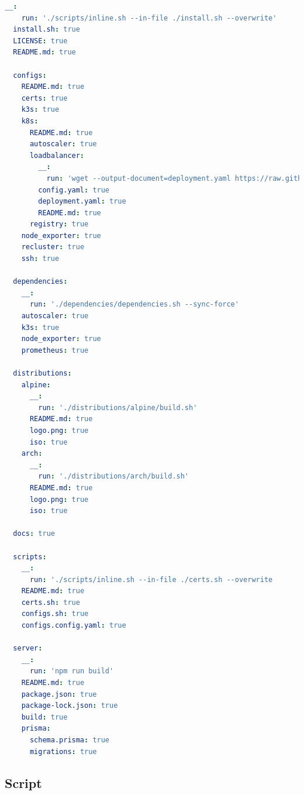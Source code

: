 \begin{lstlisting}[language=yaml, alsoletter={._-}, morekeywords={[2]{__, run, install.sh, LICENSE, README.md, configs, certs, k3s, k8s, autoscaler, loadbalancer, config.yaml, deployment.yaml, registry, node_exporter, recluster, ssh, dependencies, prometheus, distributions, alpine, arch, logo.png, iso, docs, scripts, certs.sh, configs.sh, configs.config.yaml, server, package.json, package-lock.json, build, prisma, schema.prisma, migrations}}, xleftmargin=\parindent, label={lst:bundle_config}, caption=Content of bundle configuration file]
  __:
    run: './scripts/inline.sh --in-file ./install.sh --overwrite'
  install.sh: true
  LICENSE: true
  README.md: true

  configs:
    README.md: true
    certs: true
    k3s: true
    k8s:
      README.md: true
      autoscaler: true
      loadbalancer:
        __:
          run: 'wget --output-document=deployment.yaml https://raw.githubusercontent.com/metallb                /metallb/v0.13.7/config/manifests/metallb-native.yaml'
        config.yaml: true
        deployment.yaml: true
        README.md: true
      registry: true
    node_exporter: true
    recluster: true
    ssh: true

  dependencies:
    __:
      run: './dependencies/dependencies.sh --sync-force'
    autoscaler: true
    k3s: true
    node_exporter: true
    prometheus: true

  distributions:
    alpine:
      __:
        run: './distributions/alpine/build.sh'
      README.md: true
      logo.png: true
      iso: true
    arch:
      __:
        run: './distributions/arch/build.sh'
      README.md: true
      logo.png: true
      iso: true

  docs: true

  scripts:
    __:
      run: './scripts/inline.sh --in-file ./certs.sh --overwrite                                            && ./scripts/inline.sh --in-file ./configs.sh --overwrite'
    README.md: true
    certs.sh: true
    configs.sh: true
    configs.config.yaml: true

  server:
    __:
      run: 'npm run build'
    README.md: true
    package.json: true
    package-lock.json: true
    build: true
    prisma:
      schema.prisma: true
      migrations: true
\end{lstlisting}

\subsection{Script}
\label{subsec:good_practices_bundle_script}

